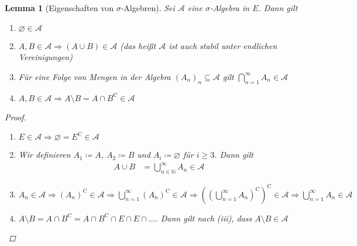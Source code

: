 \documentclass[11pt, twoside, a4paper]{article}
\theoremstyle{plain}
\newtheorem{lemma}[blockelement]{Lemma}
\numberwithin{equation}{subsection}
\newcommand{\pair}[1]{\left(#1\right)}
\newcommand{\impl}[0]{\Rightarrow{}}
\renewcommand{\emptyset}{\varnothing}
\newcommand{\comp}[1]{{#1}^{\mathrm{C}}}
\newcommand{\theoremescape}{\leavevmode}
\newcommand{\N}{\mathbb{N}}
\begin{document}
    \begin{lemma}[Eigenschaften von $\sigma$-Algebren]
        Sei $\mathcal{A}$ eine $\sigma$-Algebra in $E$. Dann gilt
        \begin{enumerate}[label=(\roman*)]
            \item $\emptyset\in\mathcal{A}$
            \item $A, B\in\mathcal{A} \impl \pair{A\cup B} \in\mathcal{A}$ (das heißt $\mathcal{A}$ ist auch stabil unter endlichen Vereinigungen)
            \item Für eine Folge von Mengen in der Algebra $\pair{A_n}_n \subseteq \mathcal{A}$ gilt $\bigcap_{n=1}^{\infty} A_n \in\mathcal{A}$
            \item $A, B\in\mathcal{A} \impl A \setminus B = A \cap \comp{B} \in \mathcal{A}$
        \end{enumerate}

        \begin{proof}
            \theoremescape
            \begin{enumerate}[label=(\roman*)]
                \item $E\in\mathcal{A} \impl \emptyset = \comp{E} \in\mathcal{A}$
                \item Wir definieren $A_1 \coloneqq A$, $A_2 \coloneqq B$ und $A_i \coloneqq \emptyset$ für $i\geq 3$. Dann gilt
                \begin{align*}
                    A \cup B &= \bigcup_{n\in\N}^{\infty} A_n \in \mathcal{A}
                \end{align*}
                \item $A_n \in \mathcal{A} \impl \comp{\pair{A_n}} \in \mathcal{A} \impl \bigcup_{n=1}^{\infty} \comp{\pair{A_n}} \in \mathcal{A} \impl \comp{\pair{\comp{\pair{\bigcup_{n=1}^{\infty} A_n}}}} \in \mathcal{A} \impl \bigcup_{n=1}^{\infty} A_n\in\mathcal{A}$
                \item $A\setminus B = A \cap \comp{B} = A \cap \comp{B} \cap E \cap E \cap \dots$. Dann gilt nach (iii), dass $A \setminus B \in\mathcal{A}$
            \end{enumerate}
        \end{proof}
    \end{lemma}
\end{document}
